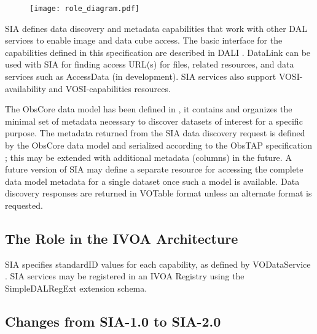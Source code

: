 \documentclass[11pt,a4paper]{ivoa}
\begin{document}
\begin{figure}[H]
\centering

\texttt{[image: role\_diagram.pdf]}
\label{fig:architecture}
\end{figure}

SIA defines data discovery and metadata capabilities that work with other DAL services to enable image and data cube access. The basic interface for the capabilities defined in this specification are described in DALI \citep{2017ivoa.spec.0517D}. DataLink can be used with SIA for finding access URL(s) for files, related resources, and data services such as AccessData (in development). SIA services also support VOSI-availability and VOSI-capabilities \citep{2017ivoa.spec.0524G}  resources.

The ObsCore data model has been defined in \citet{2017ivoa.spec.0509L}, it contains and organizes the minimal set of metadata necessary to discover datasets of interest for a specific purpose. The metadata returned from the SIA data discovery request is defined by the ObsCore data model and serialized according to the ObsTAP specification \citep{2017ivoa.spec.0509L}; this may be extended with additional metadata (columns)  in the future.  A future version of SIA may define a separate resource for accessing the complete  data model metadata for a single dataset once such a model is available. Data discovery responses are returned in VOTable \citep{2019ivoa.spec.1021O} format unless an alternate format is requested.

\subsection{The Role in the IVOA Architecture}

SIA specifies standardID values for each capability, as defined by VODataService \citep{2021ivoa.spec.1102D}. SIA services may be registered in an IVOA Registry using the SimpleDALRegExt \citep{2017ivoa.spec.0530P} extension schema.

\subsection{Changes from SIA-1.0 to SIA-2.0}
\end{document}
